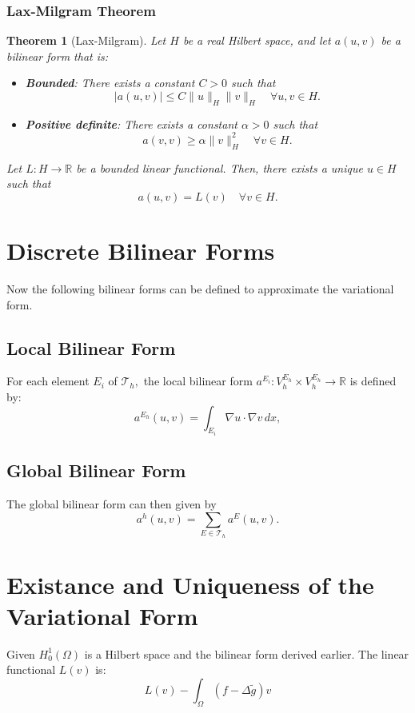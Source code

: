 \documentclass{report}
\newtheorem{theorem}{Theorem}
\begin{document}
\subsubsection{Lax-Milgram Theorem}
\begin{theorem}[Lax-Milgram]
    Let $H$ be a real Hilbert space, and let $a(u,v)$  be a bilinear form that is:
    \begin{itemize}
        \item \textbf{Bounded}: There exists a constant $C > 0$ such that
        $$
        |a(u, v)| \leq C \|u\|_H \|v\|_H \quad \forall u, v \in H.
        $$
        \item \textbf{Positive definite}: There exists a constant $\alpha > 0$ such that
        $$
        a(v, v) \geq \alpha \|v\|_H^2 \quad \forall v \in H.
        $$
    \end{itemize}
    Let $L: H \rightarrow \mathbb{R}$ be a bounded linear functional. Then, there exists a unique $u \in H$ such that
    $$
    a(u, v) = L(v) \quad \forall v \in H.
    $$ \cite{LaxMilgram1955}

\end{theorem} 


\section{Discrete Bilinear Forms}
Now the following bilinear forms can be defined to approximate the variational form.

\subsection{Local Bilinear Form}
For each element $E_i$ of $\mathcal{T}_h,$ the local bilinear form $a^{E_i}: V_h^{E_h}\times V_h^{E_h} \rightarrow \mathbb{R}$ is defined by:
$$
a^{E_h}(u, v) = \int_{E_i} \nabla u \cdot \nabla v \, dx,
$$


\subsection{Global Bilinear Form}
The global bilinear form can then given by
$$
a^h(u, v) = \sum_{E \in \mathcal{T}_h} a^E(u, v).
$$

\section{Existance and Uniqueness of the Variational Form}
Given $H^1_0(\Omega)$ is a Hilbert space and the bilinear form derived earlier. The linear functional $L(v)$ is:
$$L(v) - \int_{\Omega}(f-\Delta\tilde{g})v$$
\end{document}
